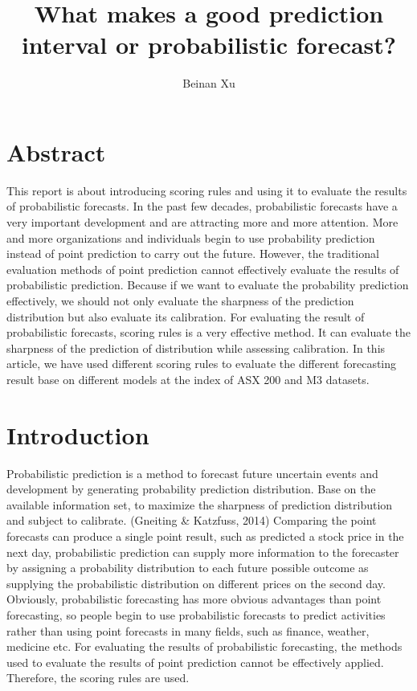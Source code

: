 \documentclass{monashthesis}
\author{Beinan Xu}
\title{What makes a good prediction interval or probabilistic forecast?}
\theoremstyle{definition}
\theoremstyle{definition}
\theoremstyle{definition}
\theoremstyle{remark}
\begin{document}

\titlepage

{\sf\tighttoc\doublespacing}

\clearpage{}\setcounter{page}{0}

\chapter*{Abstract}\label{abstract}

This report is about introducing scoring rules and using it to evaluate
the results of probabilistic forecasts. In the past few decades,
probabilistic forecasts have a very important development and are
attracting more and more attention. More and more organizations and
individuals begin to use probability prediction instead of point
prediction to carry out the future. However, the traditional evaluation
methods of point prediction cannot effectively evaluate the results of
probabilistic prediction. Because if we want to evaluate the probability
prediction effectively, we should not only evaluate the sharpness of the
prediction distribution but also evaluate its calibration. For
evaluating the result of probabilistic forecasts, scoring rules is a
very effective method. It can evaluate the sharpness of the prediction
of distribution while assessing calibration. In this article, we have
used different scoring rules to evaluate the different forecasting
result base on different models at the index of ASX 200 and M3 datasets.

\chapter{Introduction}\label{ch:intro}

Probabilistic prediction is a method to forecast future uncertain events
and development by generating probability prediction distribution. Base
on the available information set, to maximize the sharpness of
prediction distribution and subject to calibrate. (Gneiting \& Katzfuss,
2014) Comparing the point forecasts can produce a single point result,
such as predicted a stock price in the next day, probabilistic
prediction can supply more information to the forecaster by assigning a
probability distribution to each future possible outcome as supplying
the probabilistic distribution on different prices on the second day.
Obviously, probabilistic forecasting has more obvious advantages than
point forecasting, so people begin to use probabilistic forecasts to
predict activities rather than using point forecasts in many fields,
such as finance, weather, medicine etc. For evaluating the results of
probabilistic forecasting, the methods used to evaluate the results of
point prediction cannot be effectively applied. Therefore, the scoring
rules are used.
\end{document}
